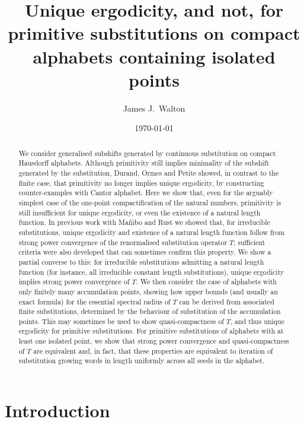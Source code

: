 \documentclass[11pt]{amsart}
\title[Unique ergodicity, and not, for primitive substitutions with isolated points]{\bf Unique ergodicity, and not, for primitive substitutions on compact alphabets containing isolated points}
\date{\today}
\author{James J.\ Walton}
\numberwithin{equation}{section}
\theoremstyle{plain}
\theoremstyle{definition}
\begin{document}
\begin{abstract}
We consider generalised subshifts generated by continuous substitution on compact Hausdorff alphabets. Although primitivity still implies minimality of the subshift generated by the substitution, Durand, Ormes and Petite showed, in contrast to the finite case, that primitivity no longer implies unique ergodicity, by constructing counter-examples with Cantor alphabet. Here we show that, even for the arguably simplest case of the one-point compactification of the natural numbers, primitivity is still insufficient for unique ergodicity, or even the existence of a natural length function. In previous work with Ma\~{n}ibo and Rust we showed that, for irreducible substitutions, unique ergodicity and existence of a natural length function follow from strong power convergence of the renormalised substitution operator \(T\); sufficient criteria were also developed that can sometimes confirm this property. We show a partial converse to this: for irreducible substitutions admitting a natural length function (for instance, all irreducible constant length substitutions), unique ergodicity implies strong power convergence of \(T\). We then consider the case of alphabets with only finitely many accumulation points, showing how upper bounds (and usually an exact formula) for the essential spectral radius of \(T\) can be derived from associated finite substitutions, determined by the behaviour of substitution of the accumulation points. This may sometimes be used to show quasi-compactness of \(T\), and thus unique ergodicity for primitive substitutions. For primitive substitutions of alphabets with at least one isolated point, we show that strong power convergence and quasi-compactness of \(T\) are equivalent and, in fact, that these properties are equivalent to iteration of substitution growing words in length uniformly across all seeds in the alphabet.
\end{abstract}

\maketitle

\section{Introduction}
\end{document}
